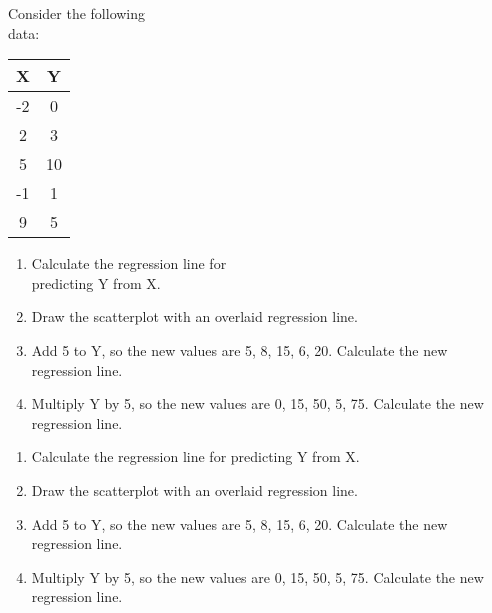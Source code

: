 \documentclass[11pt]{book}\usepackage[]{graphicx}\usepackage[]{color}
\begin{document}
\begin{exercises}
\begin{exercise}  %

Consider the following \\ data:

\begin{tabular}{@{} cc @{}} \hline
X & Y \\ \hline
-2 & 0 \\
2 & 3 \\
5 & 10 \\
-1 & 1 \\
9 & 5 \\ \hline
\end{tabular}

\begin{enumerate}
  \item Calculate the regression line for \\ predicting Y from X.
  \item Draw the scatterplot with an overlaid regression line.
  \item Add 5 to Y, so the new values are 5, 8, 15, 6, 20.  Calculate the new regression line.                                         
  \item Multiply Y by 5, so the new values are 0, 15, 50, 5, 75.  Calculate the new regression line.                                         
\end{enumerate}

\end{exercise}
\begin{solution} %

\begin{enumerate}
  \item Calculate the regression line for predicting Y from X.
  \item Draw the scatterplot with an overlaid regression line.
  \item Add 5 to Y, so the new values are 5, 8, 15, 6, 20.  Calculate the new regression line.                          
  \item Multiply Y by 5, so the new values are 0, 15, 50, 5, 75.  Calculate the new regression line.                  
\end{enumerate}

\end{solution}

\begin{exercise} %


\end{exercise}
\end{exercises}
\end{document}
